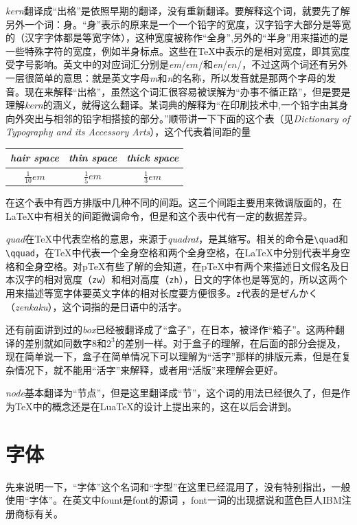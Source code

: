 \documentclass{article}
\begin{document}
\textit{kern}翻译成“出格”是依照早期的翻译，没有重新翻译。要解释这个词，就要先了解另外一个词：身。“身”表示的原来是一个一个铅字的宽度，汉字铅字大部分是等宽的（汉字字体都是等宽字体），这种宽度被称作“全{\hei 身}”,另外的“半{\hei 身}”用来描述的是一些特殊字符的宽度，例如半身标点。这些在\TeX 中表示的是相对宽度，即其宽度受字号影响。英文中的对应词汇分别是\textit{em}/$\epsilon m$/和\textit{en}/$\epsilon n$/，不过这两个词还有另外一层很简单的意思：就是英文字母\textit{m}和\textit{n}的名称，所以发音就是那两个字母的发音。现在来解释“出格”，虽然这个词汇很容易被误解为“办事不循正路”，但是要是理解\textit{kern}的涵义，就得这么翻译。某词典的解释为“在印刷技术中,一个铅字由其身向外突出与相邻的铅字相搭接的部分。”顺带讲一下下面的这个表（见\textit{Dictionary of Typography and its Accessory Arts}），这个代表着间距的量
\begin{table}[!ht]
\begin{center}
\begin{tabular}{ccc}
\hline
\textit{hair space}&\textit{thin space}&\textit{thick space}\\
\hline
$\frac{1}{10}em$&$\frac{1}{5}em$&$\frac{1}{3}em$\\
\hline
\end{tabular}
\end{center}
\end{table}
在这个表中有西方排版中几种不同的间距。这三个间距主要用来微调版面的，在\LaTeX 中有相关的间距微调命令，但是和这个表中代有一定的数据差异。

\textit{quad}在\TeX 中代表空格的意思，来源于\textit{quadrat}，是其缩写。相关的命令是\verb!\quad!和\verb!\qquad!，在\TeX 中代表一个全身空格和两个全身空格，在\LaTeX 中分别代表半身空格和全身空格。对p\TeX 有些了解的会知道，在p\TeX 中有两个来描述日文假名及日本汉字的相对宽度（\verb!zw!）和相对高度（\verb!zh!），日文的字体也是等宽的，所以这两个用来描述等宽字体要英文字体的相对长度要方便很多。\verb!z!代表的是ぜんかく（\textit{zenkaku}），这个词指的是日语中的活字。

还有前面讲到过的\textit{box}已经被翻译成了“盒子”，在日本，被译作“箱子”。这两种翻译的差别就如同数字8和$2^3$的差别一样。对于盒子的理解，在后面的部分会提及，现在简单说一下，盒子在简单情况下可以理解为“活字”那样的排版元素，但是在复杂情况下，就不能用“活字”来解释，或者用“活版”来理解会更好。

\textit{node}基本翻译为“节点”，但是这里翻译成“节”，这个词的用法已经很久了，但是作为\TeX 中的概念还是在Lua\TeX 的设计上提出来的，这在以后会讲到。
\section{字体}
先来说明一下，“字体”这个名词和“字型”在这里已经混用了，没有特别指出，一般使用“字体”。在英文中fount是font的源词 ，font一词的出现据说和蓝色巨人IBM注册商标有关。
\end{document}
